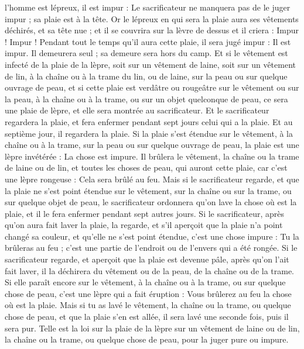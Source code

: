 \begin{multicols}{2}
l'homme est lépreux, il est impur : Le sacrificateur ne manquera pas de le juger impur ; sa plaie est à la tête.
Or le lépreux en qui sera la plaie aura ses vêtements déchirés, et sa tête nue ; et il se couvrira sur la lèvre de dessus et il criera : Impur ! Impur !
Pendant tout le temps qu'il aura cette plaie, il sera jugé impur : Il est impur. Il demeurera seul ; sa demeure sera hors du camp.
Et si le vêtement est infecté de la plaie de la lèpre, soit sur un vêtement de laine, soit sur un vêtement de lin,
à la chaîne ou à la trame du lin, ou de laine, sur la peau ou sur quelque ouvrage de peau,
et si cette plaie est verdâtre ou rougeâtre sur le vêtement ou sur la peau, à la chaîne ou à la trame, ou sur un objet quelconque de peau, ce sera une plaie de lèpre, et elle sera montrée au sacrificateur.
Et le sacrificateur regardera la plaie, et fera enfermer pendant sept jours celui qui a la plaie.
Et au septième jour, il regardera la plaie. Si la plaie s'est étendue sur le vêtement, à la chaîne ou à la trame, sur la peau ou sur quelque ouvrage de peau, la plaie est une lèpre invétérée : La chose est impure.
Il brûlera le vêtement, la chaîne ou la trame de laine ou de lin, et toutes les choses de peau, qui auront cette plaie, car c'est une lèpre rongeuse : Cela sera brûlé au feu.
Mais si le sacrificateur regarde, et que la plaie ne s'est point étendue sur le vêtement, sur la chaîne ou sur la trame, ou sur quelque objet de peau,
le sacrificateur ordonnera qu'on lave la chose où est la plaie, et il le fera enfermer pendant sept autres jours.
Si le sacrificateur, après qu'on aura fait laver la plaie, la regarde, et s'il aperçoit que la plaie n'a point changé sa couleur, et qu'elle ne s'est point étendue, c'est une chose impure : Tu la brûleras au feu ; c'est une partie de l'endroit ou de l'envers qui a été rongée.
Si le sacrificateur regarde, et aperçoit que la plaie est devenue pâle, après qu'on l'ait fait laver, il la déchirera du vêtement ou de la peau, de la chaîne ou de la trame.
Si elle paraît encore sur le vêtement, à la chaîne ou à la trame, ou sur quelque chose de peau, c'est une lèpre qui a fait éruption : Vous brûlerez au feu la chose où est la plaie.
Mais si tu as lavé le vêtement, la chaîne ou la trame, ou quelque chose de peau, et que la plaie s'en est allée, il sera lavé une seconde fois, puis il sera pur.
Telle est la loi sur la plaie de la lèpre sur un vêtement de laine ou de lin, la chaîne ou la trame, ou quelque chose de peau, pour la juger pure ou impure.

\end{multicols}
